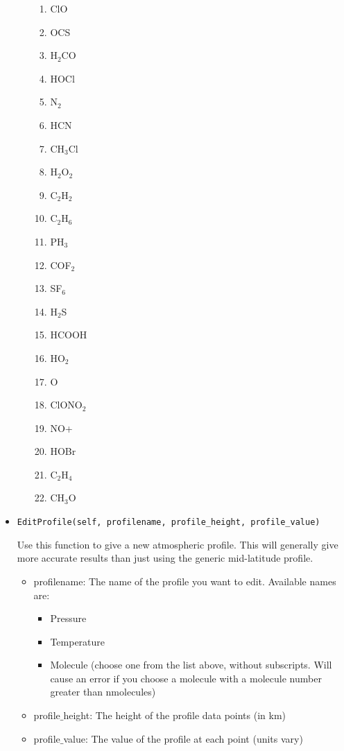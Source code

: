 \documentclass{article}
\begin{document}
\begin{itemize}
\begin{itemize}
\begin{enumerate}
                \item   ClO
                \item   OCS
                \item   H$_2$CO		 
                \item   HOCl
                \item   N$_2$
                \item   HCN
                \item   CH$_3$Cl
                \item   H$_2$O$_2$
                \item   C$_2$H$_2$
                \item   C$_2$H$_6$
                \item   PH$_3$
                \item   COF$_2$
                \item   SF$_6$
                \item   H$_2$S
                \item   HCOOH
                \item   HO$_2$
                \item   O
                \item   ClONO$_2$
                \item   NO+
                \item   HOBr
                \item   C$_2$H$_4$
                \item   CH$_3$O
  \end{enumerate}
  \end{itemize}
  
  \item \begin{Verbatim}[commandchars=\\\{\}]
EditProfile(self, profilename, profile_height, profile_value)
    \end{Verbatim}
   Use this function to give a new atmospheric profile. This will generally give more accurate results than just using the generic mid-latitude profile. 
  
  \begin{itemize}
  \item profilename: The name of the profile you want to edit. Available names are:
  \begin{itemize}
    \item Pressure
    \item Temperature
    \item Molecule (choose one from the list above, without subscripts. Will cause an error if you choose a molecule with a molecule number greater than nmolecules)
  \end{itemize}
  \item profile$\_$height: The height of the profile data points (in km)
  \item profile$\_$value: The value of the profile at each point (units vary)
  \end{itemize}
  

\end{itemize}
\end{document}
